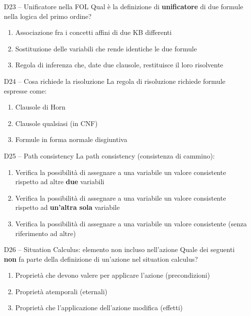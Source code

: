 \documentclass[12pt,a4paper]{article}
\begin{document}
\begin{domanda}{D23 -- Unificatore nella FOL}
Qual è la definizione di \textbf{unificatore} di due formule nella logica del primo ordine?
\begin{enumerate}[label=\alph*.]
  \item Associazione fra i concetti affini di due KB differenti
  \item Sostituzione delle variabili che rende identiche le due formule
  \item Regola di inferenza che, date due clausole, restituisce il loro risolvente
\end{enumerate}
\end{domanda}

\begin{domanda}{D24 -- Cosa richiede la risoluzione}
La regola di risoluzione richiede formule espresse come:
\begin{enumerate}[label=\alph*.]
  \item Clausole di Horn
  \item Clausole qualsiasi (in CNF)
  \item Formule in forma normale disgiuntiva
\end{enumerate}
\end{domanda}

\begin{domanda}{D25 -- Path consistency}
La path consistency (consistenza di cammino):
\begin{enumerate}[label=\alph*.]
  \item Verifica la possibilità di assegnare a una variabile un valore consistente rispetto ad altre \textbf{due} variabili
  \item Verifica la possibilità di assegnare a una variabile un valore consistente rispetto ad \textbf{un'altra sola} variabile
  \item Verifica la possibilità di assegnare a una variabile un valore consistente (senza riferimento ad altre)
\end{enumerate}
\end{domanda}

\begin{domanda}{D26 -- Situation Calculus: elemento non incluso nell'azione}
Quale dei seguenti \textbf{non} fa parte della definizione di un'azione nel situation calculus?
\begin{enumerate}[label=\alph*.]
  \item Proprietà che devono valere per applicare l'azione (precondizioni)
  \item Proprietà atemporali (eternali)
  \item Proprietà che l'applicazione dell'azione modifica (effetti)
\end{enumerate}
\end{domanda}
\end{document}
